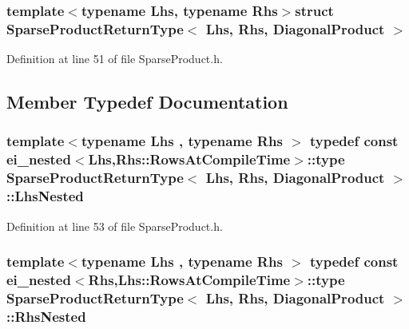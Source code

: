 \subsubsection*{template$<$typename Lhs, typename Rhs$>$struct Sparse\-Product\-Return\-Type$<$ Lhs, Rhs, Diagonal\-Product $>$}



Definition at line 51 of file Sparse\-Product.\-h.



\subsection{Member Typedef Documentation}
\hypertarget{struct_sparse_product_return_type_3_01_lhs_00_01_rhs_00_01_diagonal_product_01_4_ad643a2d49fbe26a350fc93993fae67e3}{
\subsubsection[{Lhs\-Nested}]{\setlength{\rightskip}{0pt plus 5cm}template$<$typename Lhs , typename Rhs $>$ typedef const {\bf ei\-\_\-nested}$<$Lhs,Rhs\-::\-Rows\-At\-Compile\-Time$>$\-::{\bf type} {\bf Sparse\-Product\-Return\-Type}$<$ Lhs, Rhs, {\bf Diagonal\-Product} $>$\-::{\bf Lhs\-Nested}}}\label{struct_sparse_product_return_type_3_01_lhs_00_01_rhs_00_01_diagonal_product_01_4_ad643a2d49fbe26a350fc93993fae67e3}


Definition at line 53 of file Sparse\-Product.\-h.

\hypertarget{struct_sparse_product_return_type_3_01_lhs_00_01_rhs_00_01_diagonal_product_01_4_a7c01138004234bb975371f32dae31e20}{
\subsubsection[{Rhs\-Nested}]{\setlength{\rightskip}{0pt plus 5cm}template$<$typename Lhs , typename Rhs $>$ typedef const {\bf ei\-\_\-nested}$<$Rhs,Lhs\-::\-Rows\-At\-Compile\-Time$>$\-::{\bf type} {\bf Sparse\-Product\-Return\-Type}$<$ Lhs, Rhs, {\bf Diagonal\-Product} $>$\-::{\bf Rhs\-Nested}}}\label{struct_sparse_product_return_type_3_01_lhs_00_01_rhs_00_01_diagonal_product_01_4_a7c01138004234bb975371f32dae31e20}


